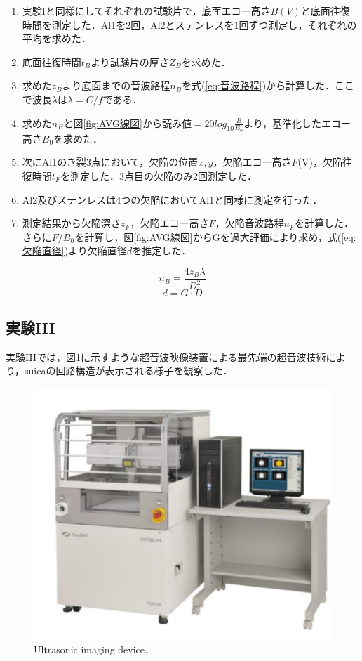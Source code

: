 \begin{enumerate}
    \item 実験Iと同様にしてそれぞれの試験片で，底面エコー高さ$B(V)$と底面往復時間を測定した．Al1を2回，Al2とステンレスを1回ずつ測定し，それぞれの平均を求めた．
    \item 底面往復時間$t_B$より試験片の厚さ$Z_B$を求めた．
    \item 求めた$z_B$より底面までの音波路程$n_B$を式(\ref{eq:音波路程})から計算した．ここで波長$\lambda$は$\lambda = C/f$である．
    \item 求めた$n_B$と図\ref{fig:AVG線図}から読み値$= 20log_{10} \frac{B}{B_0}$より，基準化したエコー高さ$B_0$を求めた．
    \item 次にAl1のき裂3点において，欠陥の位置$x, y$，欠陥エコー高さ$F$(V)，欠陥往復時間$t_F$を測定した．3点目の欠陥のみ2回測定した．
    \item Al2及びステンレスは4つの欠陥においてAl1と同様に測定を行った．
    \item 測定結果から欠陥深さ$z_F$，欠陥エコー高さ$F$，欠陥音波路程$n_F$を計算した．さらに$F/B_0$を計算し，図\ref{fig:AVG線図}からGを過大評価により求め，式(\ref{eq:欠陥直径})より欠陥直径$d$を推定した．
\end{enumerate}
\begin{equation}
    \label{eq:音波路程}
    n_B = \frac{4z_B\lambda}{D^2}
\end{equation}
\begin{equation}
    \label{eq:欠陥直径}
    d = G \cdot D
\end{equation}

\subsection{実験III}
実験IIIでは，図\ref{fig:超音波映像装置}に示すような超音波映像装置による最先端の超音波技術により，suicaの回路構造が表示される様子を観察した．

\begin{figure}[htbp]
    \centering %
    \includegraphics[width=100truemm,clip]{fig/超音波映像装置.png}
    \caption{Ultrasonic imaging device．}
    \label{fig:超音波映像装置}
\end{figure}